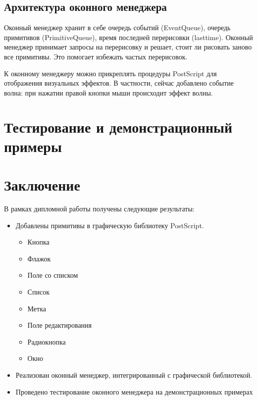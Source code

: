 \documentclass[14pt]{extarticle}
\begin{document}
	\subsection{ Архитектура оконного менеджера}
	Оконный менеджер хранит в себе очередь событий (EventQueue), очередь примитивов (PrimitiveQueue), время последней перерисовки (lasttime). Оконный менеджер принимает запросы на перерисовку и решает, стоит ли рисовать заново все примитивы. Это помогает избежать частых перерисовок.
	
	К оконному менеджеру можно прикреплять процедуры PostScript для отображения визуальных эффектов. В частности, сейчас добавлено событие волна: при нажатии правой кнопки мыши происходит эффект волны. 
	\pagebreak
	\section{Тестирование и демонстрационный примеры}

	\pagebreak
	
	\section*{Заключение}
	
	В рамках дипломной работы получены следующие результаты:
	\begin{itemize}
		\item Добавлены примитивы в графическую библиотеку  PostScript.
		\begin{itemize}
			\item Кнопка
			\item Флажок
			\item Поле со списком
			\item Список
			\item Метка
			\item Поле редактирования
			\item Радиокнопка
			\item Окно
		\end{itemize}
		\item Реализован оконный менеджер, интегрированный с графической библиотекой.
		\item Проведено тестирование оконного менеджера на демонстрационных примерах
	\end{itemize}
	

	
	\pagebreak
	
	
\end{document}
